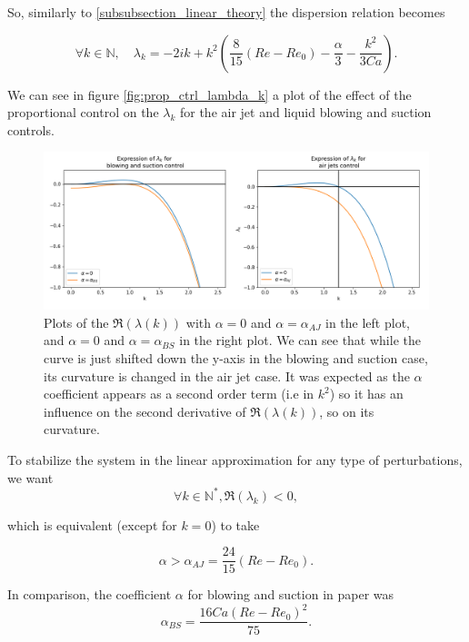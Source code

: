 \documentclass[12pt]{article}
\begin{document}
So, similarly to \eqref{subsubsection_linear_theory} the dispersion relation becomes

\begin{equation}\label{eq_dispertion_prop_ctrl}
    \forall k\in \mathbb{N},\quad \lambda_k = -2ik+ k^2\left(\frac{8}{15}(Re-Re_0)-\frac{\alpha}{3}-\frac{k^2}{3Ca}\right).
\end{equation}

We can see in figure \eqref{fig:prop_ctrl_lambda_k} a plot of the effect of the proportional control on the $\lambda_k$ for the air jet 
and liquid blowing and suction controls.


\begin{figure}[h]
\includegraphics[width=1\textwidth]{Control_experiments/lambda_k_BS_AJ.png}
\caption{Plots of the $\mathfrak{R}(\lambda(k))$ with $\alpha = 0$ and $\alpha = \alpha_{AJ} $ in the left plot, and $\alpha = 0$ 
and $\alpha = \alpha_{BS}$ in the right plot. We can see that while the curve is just shifted down the y-axis in the blowing and 
suction case, its curvature is changed in the air jet case. It was expected as the $\alpha$ coefficient appears as a second order 
term (i.e in $k^2$) so it has an influence on the second derivative of $\mathfrak{R}(\lambda(k))$, so on its curvature.}
\label{fig:prop_ctrl_lambda_k}
\end{figure}


To stabilize the system in the linear approximation for any type of perturbations, we want $$\forall k \in \mathbb{N}^*, \mathfrak{R}(\lambda_k) <0,$$

which is equivalent (except for $k=0$) to take 

\begin{equation}\label{eq:alpha_AJ}
    \boxed{
    \alpha > \alpha_{AJ}= \frac{24}{15}(Re-Re_0).
    }
\end{equation}


In comparison, the coefficient $\alpha$ for blowing and suction in paper \cite{Thompson_2016_prop_ctrl} was 
\begin{equation}
    \alpha_{BS} = \frac{16Ca(Re-Re_0)^2}{75}.
\end{equation}
\end{document}
